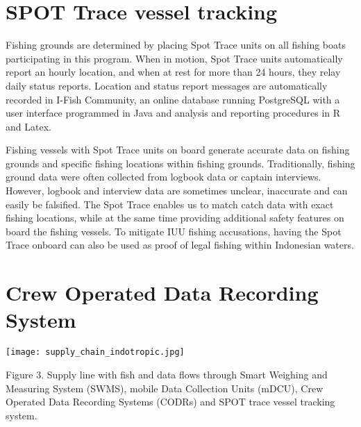 \section{SPOT Trace vessel tracking}

Fishing grounds are determined by placing Spot Trace units on all fishing boats participating in this program. When in motion, Spot Trace units automatically report an hourly location, and when at rest for more than 24 hours, they relay daily status reports. Location and status report messages are automatically recorded in I-Fish Community, an online database running PostgreSQL with a user interface programmed in Java and analysis and reporting procedures in R and Latex.

Fishing vessels with Spot Trace units on board generate accurate data on fishing grounds and specific fishing locations within fishing grounds. Traditionally, fishing ground data were often collected from logbook data or captain interviews. However, logbook and interview data are sometimes unclear, inaccurate and can easily be falsified. The Spot Trace enables us to match catch data with exact fishing locations, while at the same time providing additional safety features on board the fishing vessels. To mitigate IUU fishing accusations, having the Spot Trace onboard can also be used as proof of legal fishing within Indonesian waters.

\section{Crew Operated Data Recording System}

\begin{center}
\graphicspath{{/root/R-project/IFishSnapperWPP714_715/Images/}}
\texttt{[image: supply\_chain\_indotropic.jpg]}

Figure 3. Supply line with fish and data flows through Smart Weighing and Measuring System (SWMS), mobile Data Collection Units (mDCU), Crew Operated Data Recording Systems (CODRs) and SPOT trace vessel tracking system.
\end{center}

